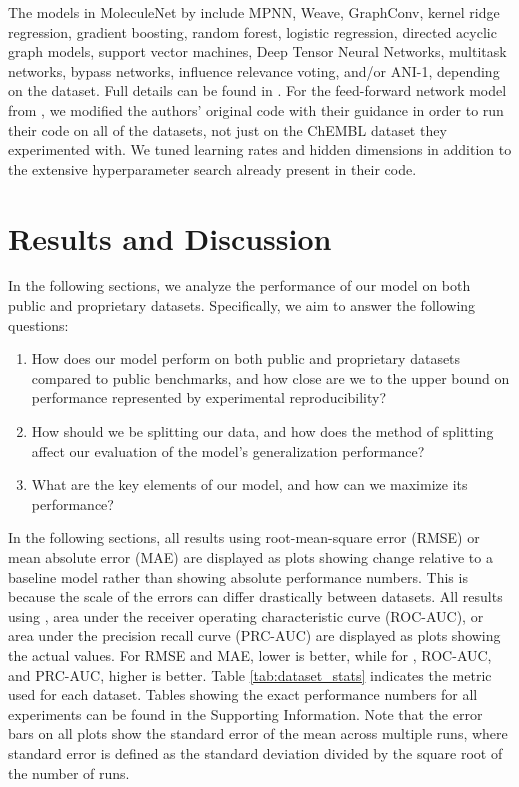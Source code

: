 \documentclass[journal=jcisd8,manuscript=article]{achemso}
\begin{document}
The models in MoleculeNet by \citeauthor{Wu_2018}\cite{Wu_2018} include MPNN\cite{gilmer2017neural}, Weave\cite{kearnes2016molecular}, GraphConv, kernel ridge regression, gradient boosting\cite{friedman2001greedy}, random forest\cite{breiman2001random}, logistic regression\cite{cramer2010logreg}, directed acyclic graph models\cite{lusci2013deep}, support vector machines\cite{vapnik1995svm}, Deep Tensor Neural Networks\cite{schutt2017quantum}, multitask networks\cite{ma2015deep}, bypass networks\cite{ramsundar2017multitask}, influence relevance voting\cite{swamidass2009influence}, and/or ANI-1\cite{smith2017ani}, depending on the dataset. Full details can be found in \citeauthor{Wu_2018}\cite{Wu_2018}. For the feed-forward network model from \citeauthor{mayr2018chembl}\cite{mayr2018chembl}, we modified the authors' original code with their guidance in order to run their code on all of the datasets, not just on the ChEMBL dataset they experimented with. We tuned learning rates and hidden dimensions in addition to the extensive hyperparameter search already present in their code.

\section{Results and Discussion}

In the following sections, we analyze the performance of our model on both public and proprietary datasets. Specifically, we aim to answer the following questions:
\begin{enumerate}
    \item How does our model perform on both public and proprietary datasets compared to public benchmarks, and how close are we to the upper bound on performance represented by experimental reproducibility?
    \item How should we be splitting our data, and how does the method of splitting affect our evaluation of the model's generalization performance?
    \item What are the key elements of our model, and how can we maximize its performance? \end{enumerate}

In the following sections, all results using root-mean-square error (RMSE) or mean absolute error (MAE) are displayed as plots showing change relative to a baseline model rather than showing absolute performance numbers. This is because the scale of the errors can differ drastically between datasets. All results using , area under the receiver operating characteristic curve (ROC-AUC), or area under the precision recall curve (PRC-AUC) are displayed as plots showing the actual values. For RMSE and MAE, lower is better, while for , ROC-AUC, and PRC-AUC, higher is better. Table \ref{tab:dataset_stats} indicates the metric used for each dataset. Tables showing the exact performance numbers for all experiments can be found in the Supporting Information. Note that the error bars on all plots show the standard error of the mean across multiple runs, where standard error is defined as the standard deviation divided by the square root of the number of runs.
\end{document}
